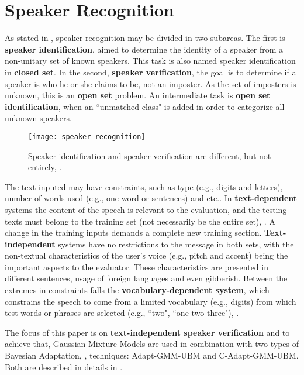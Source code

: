 \section{Speaker Recognition}
\label{sec:speaker-recognition}

As stated in , speaker recognition may be divided in two subareas. The first is \textbf{speaker identification}, aimed to determine the identity of a speaker from a non-unitary set of known speakers. This task is also named speaker identification in \textbf{closed set}. In the second, \textbf{speaker verification}, the goal is to determine if a speaker is who he or she claims to be, not an imposter. As the set of imposters is unknown, this is an \textbf{open set} problem. An intermediate task is \textbf{open set identification}, when an ``unmatched class" is added in order to categorize all unknown speakers.

\begin{figure}[ht]
    \centering
    \texttt{[image: speaker-recognition]}
    \caption{Speaker identification and speaker verification are different, but not entirely, .}
    \label{fig:speaker-recognition}
\end{figure}

The text inputed may have constraints, such as type (e.g., digits and letters), number of words used (e.g., one word or sentences) and etc.. In \textbf{text-dependent} systems the content of the speech is relevant to the evaluation, and the testing texts must belong to the training set (not necessarily be the entire set), . A change in the training inputs demands a complete new training section. \textbf{Text-independent} systems have no restrictions to the message in both sets, with the non-textual characteristics of the user's voice (e.g., pitch and accent) being the important aspects to the evaluator. These characteristics are presented in different sentences, usage of foreign languages and even gibberish. Between the extremes in constraints falls the \textbf{vocabulary-dependent system}, which constrains the speech to come from a limited vocabulary (e.g., digits) from which test words or phrases are selected (e.g., ``two", ``one-two-three"), .

The focus of this paper is on \textbf{text-independent speaker verification} and to achieve that, Gaussian Mixture Models are used in combination with two types of Bayesian Adaptation, , techniques: Adapt-GMM-UBM and C-Adapt-GMM-UBM. Both are described in details in .

